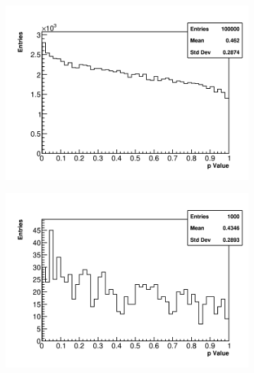 \begin{figure}[]
    \begin{subfigure}[t]{0.45\textwidth}
        \centering
        \includegraphics[width=\textwidth]{PValues_RMethod}
        \caption{}
    \end{subfigure}
    \hspace{1mm}
    \begin{subfigure}[t]{0.45\textwidth}
        \centering
        \includegraphics[width=\textwidth]{PValues_QMethod}
        \caption{}
    \end{subfigure}
\caption[]{}
\label{fig:}
\end{figure}


